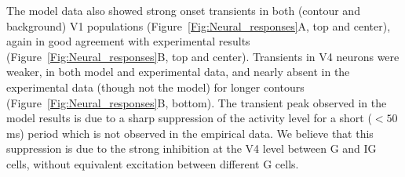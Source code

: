 The model data also showed strong onset transients in both (contour
and background) V1 populations (Figure~\ref{Fig:Neural_responses}A,
top and center), again in good agreement with experimental results
(Figure~\ref{Fig:Neural_responses}B, top and center). Transients in V4
neurons were weaker, in both model and experimental data, and nearly
absent in the experimental data (though not the model) for longer
contours (Figure~\ref{Fig:Neural_responses}B, bottom).
%
%
%
The transient peak observed in the model results
is due to a sharp suppression of the activity level for a short
($<50$ms) period which is not observed in the empirical data. We
believe that this suppression is due to the  strong inhibition at the
V4 level between G and IG cells, without equivalent
excitation between different G cells.
%
%
%

